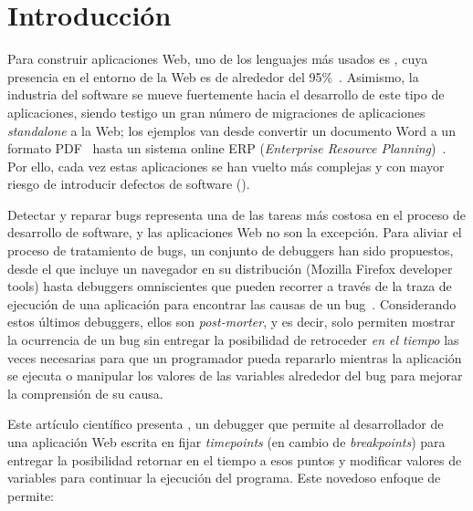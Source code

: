 \documentclass[conference]{IEEEtran}
\begin{document}
\section{Introducci\'on}
\label{sec:intro}

Para construir aplicaciones Web, uno de los lenguajes m\'as usados es \javascript, cuya presencia en el entorno de la Web es de alrededor del 95\%~\cite{jsuses}. Asimismo, la industria del software se mueve fuertemente hacia el desarrollo de este tipo de aplicaciones, siendo testigo un gran n\'umero de migraciones de aplicaciones {\em standalone} a la Web; los ejemplos van desde convertir un documento Word a un formato PDF~\cite{smallpdf} hasta un sistema online ERP ({\em Enterprise Resource Planning})~\cite{erpOrcale}. Por ello, cada vez estas aplicaciones se han vuelto m\'as complejas y con mayor riesgo de introducir defectos de software (). 

Detectar y reparar bugs representa una de las tareas m\'as costosa en el proceso de desarrollo de software, y las aplicaciones Web no son la excepci\'on. Para aliviar el proceso de tratamiento de bugs, un conjunto de debuggers han sido propuestos, desde el que incluye un navegador en su distribuci\'on (\eg Mozilla Firefox developer tools) hasta  debuggers omniscientes que pueden recorrer a trav\'es de la traza de ejecuci\'on de una aplicaci\'on para encontrar las causas de un bug~\cite{azar:2016,barrAl:fse2016}. Considerando estos \'ultimos debuggers, ellos son {\em post-morter}, y es decir, solo permiten mostrar la ocurrencia de un bug sin entregar la posibilidad de retroceder {\em en el tiempo} las veces necesarias para que un programador pueda repararlo mientras la aplicaci\'on se ejecuta o manipular los valores de las variables alrededor del bug para mejorar la comprensi\'on de su causa.       

Este art\'iculo cient\'ifico presenta \deloreanjs, un debugger que permite al desarrollador de una aplicaci\'on Web escrita en \javascript fijar {\em timepoints} (en cambio de {\em breakpoints}) para entregar la posibilidad retornar en el tiempo a esos puntos y modificar valores de variables para continuar la ejecuci\'on del programa. Este novedoso enfoque de \deloreanjs permite:    
\end{document}
